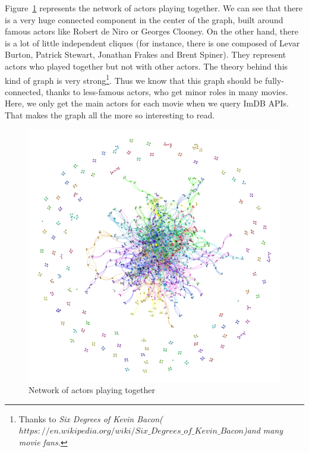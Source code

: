 \newpage
Figure~\ref{fig:coocActors} represents the network of actors playing together.
We can see that there is a very huge connected component in the center of the graph, built around famous actors like Robert de Niro or Georges Clooney.
On the other hand, there is a lot of little independent cliques (for instance, there is one composed of Levar Burton, Patrick Stewart, Jonathan Frakes and Brent Spiner).
They represent actors who played together but not with other actors.
The theory behind this kind of graph is very strong\footnote{Thanks to \textit{Six Degrees of Kevin Bacon(}$https://en.wikipedia.org/wiki/Six\_Degrees\_of\_Kevin\_Bacon$\textit{)and many movie fans.}}.
Thus we know that this graph should be fully-connected, thanks to less-famous actors, who get minor roles in many movies.
Here, we only get the main actors for each movie when we query ImDB APIs. That makes the graph all the more so interesting to read.

\begin{figure}[!h]
\begin{center}
\includegraphics[width=1.1\textwidth]{../src/pre-processing/stats/results/CoocActors.png}
\end{center}
\caption{Network of actors playing together}
\label{fig:coocActors}
\end{figure}
